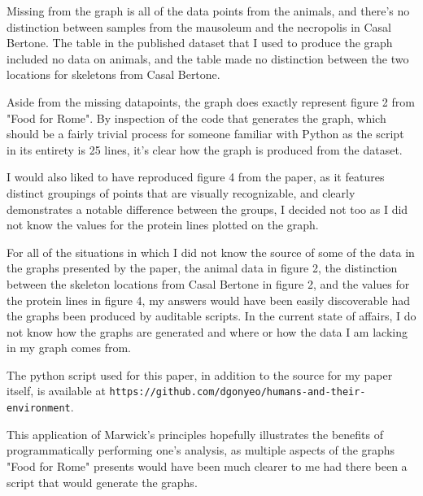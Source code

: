\documentclass[12pt]{article}
\begin{document}
Missing from the graph is all of the data points from the animals, and there's
no distinction between samples from the mausoleum and the necropolis in Casal
Bertone. The table in the published dataset that I used to produce the graph
included no data on animals, and the table made no distinction between the two
locations for skeletons from Casal Bertone.

Aside from the missing datapoints, the graph does exactly represent figure 2
from "Food for Rome". By inspection of the code that generates the graph, which
should be a fairly trivial process for someone familiar with Python as the
script in its entirety is 25 lines, it's clear how the graph is produced from
the dataset.

I would also liked to have reproduced figure 4 from the paper, as it features
distinct groupings of points that are visually recognizable, and clearly
demonstrates a notable difference between the groups, I decided not too as I
did not know the values for the protein lines plotted on the graph.

For all of the situations in which I did not know the source of some of the
data in the graphs presented by the paper, the animal data in figure 2, the
distinction between the skeleton locations from Casal Bertone in figure 2, and
the values for the protein lines in figure 4, my answers would have been easily
discoverable had the graphs been produced by auditable scripts. In the current
state of affairs, I do not know how the graphs are generated and where or how
the data I am lacking in my graph comes from.

The python script used for this paper, in addition to the source for my paper
itself, is available at
\texttt{https://github.com/dgonyeo/humans-and-their-environment}.

This application of Marwick's principles hopefully illustrates the benefits of
programmatically performing one's analysis, as multiple aspects of the graphs
"Food for Rome" presents would have been much clearer to me had there been a
script that would generate the graphs.
\end{document}
